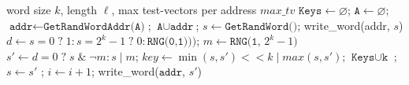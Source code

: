 \setlength{\textfloatsep}{-10pt} {
	\begin{algorithm}[t!]
		\footnotesize
		\caption{1-word, random, unipolar walk\label{alg:ruw}}
		\begin{algorithmic}[1]
			\Require word size $k$, length $\ell$, max test-vectors per address $\textit{max\_tv}$
			\State $\texttt{Keys} \gets \varnothing$; $\texttt{A} \gets \varnothing$; 
			\State $\texttt{addr}\gets\texttt{GetRandWordAddr(A)}$; $\texttt{A} \cup \texttt{addr}$;
			\State $s \gets \texttt{GetRandWord()}$;
			\State write\_word(addr, $s$)
			\EndIf
			\State $d \gets  s=0 \; ? \; 1 : s=2^k-1 \; ? \; 0 : \texttt{RNG(0,1)}))$;
			\State $m \gets \texttt{RNG(1, $2^k -1$)}$
			\State $s' \gets d=0\; ? \;s\; \& \; \neg m : s\; | \; m $;
			\State $key \gets \min(s,s') << k \; | \; max(s, s')$;
			\State $\texttt{Keys} \cup \texttt{k}$ ; $s \gets s'$ ; $i\gets i+1$;
			\State write\_word($\texttt{addr}$, $s'$)
			\EndIf
			\EndWhile
		\end{algorithmic}
	\end{algorithm}
}
\setlength{\textfloatsep}{3pt}